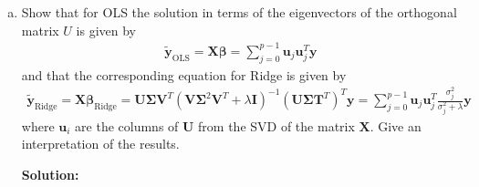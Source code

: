 \documentclass{article}
\begin{document}
\begin{enumerate}[a)]
		\item Show that for OLS the solution in terms of the eigenvectors of the orthogonal matrix $U$ is given by
		\begin{align*}
			\tilde{\bm{y}}_\text{OLS}=\bm{X}\bm{\beta}=\sum_{j=0}^{p-1}\bm{u}_j\bm{u}_j^T\bm{y}
		\end{align*}
		and that the corresponding equation for Ridge is given by
		\begin{align*}
			\tilde{\bm{y}}_\text{Ridge}=\bm{X}\bm{\beta}_\text{Ridge}=\bm{U\Sigma V}^T(\bm{V\Sigma}^2\bm{V}^T+\lambda\bm{I})^{-1}(\bm{U\Sigma T}^T)^T\bm{y}=\sum_{j=0}^{p-1}\bm{u}_j\bm{u}_j^T\frac{\sigma_j^2}{\sigma_j^2+\lambda}\bm{y}
		\end{align*}
		where $\bm{u}_i$ are the columns of $\bm{U}$ from the SVD of the matrix $\bm{X}$. Give an interpretation of the results.
		
		\textbf{Solution:}
		

\end{enumerate}
\end{document}

